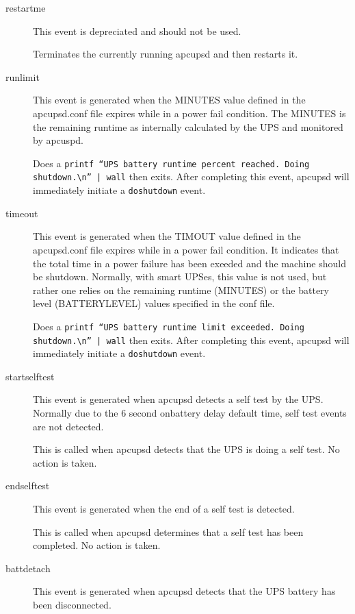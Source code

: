 {{{{{{\begin{description}
\item [restartme]
   This event is depreciated and should not be used.  

Terminates the currently running apcupsd and then restarts it.  

\item [runlimit]
   This event is generated when the MINUTES value defined in the apcupsd.conf
file expires while in a power fail condition. The MINUTES is the remaining
runtime as internally calculated by the UPS and monitored by apcuspd.  

Does a {\tt printf ``UPS battery runtime percent reached. Doing
shutdown.\textbackslash{}n'' | wall} then exits.  After completing this event,
apcupsd will immediately initiate a {\tt doshutdown} event.  

\item [timeout]
   This event is generated when the TIMOUT value defined in the apcupsd.conf file
expires while in a power fail condition. It indicates that the total time in a
power failure has been exeeded and the machine should be shutdown. Normally,
with smart UPSes, this value is not used, but rather one relies on the
remaining runtime (MINUTES) or the battery level (BATTERYLEVEL) values
specified in the conf file.  

Does a {\tt printf ``UPS battery runtime limit exceeded. Doing
shutdown.\textbackslash{}n'' | wall} then exits. After completing this event,
apcupsd will immediately initiate a {\tt doshutdown} event.  

\item [startselftest]
   This event is generated when apcupsd detects a self test by the UPS. Normally
due to the 6 second onbattery delay default time, self test events are not
detected.  

This is called when apcupsd detects that the UPS is doing a self test. No
action is taken.  

\item [endselftest]
   This event is generated when the end of a self test is detected.  

This is called when apcupsd determines that a self test has been completed. No
action is taken.  

\item [battdetach]
   This event is generated when apcupsd detects that the UPS battery has been
disconnected.


\end{description}}}}}}}
